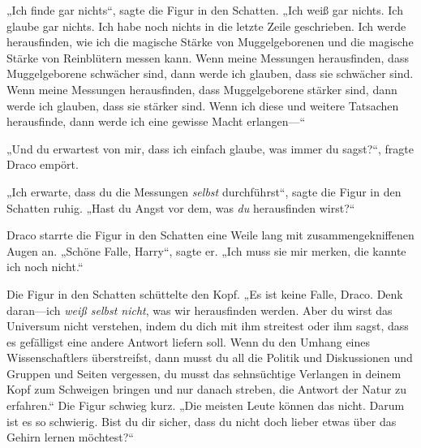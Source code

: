 „Ich finde gar nichts“, sagte die Figur in den Schatten. „Ich weiß gar nichts. Ich glaube gar nichts. Ich habe noch nichts in die letzte Zeile geschrieben. Ich werde herausfinden, wie ich die magische Stärke von Muggelgeborenen und die magische Stärke von Reinblütern messen kann. Wenn meine Messungen herausfinden, dass Muggelgeborene schwächer sind, dann werde ich glauben, dass sie schwächer sind. Wenn meine Messungen herausfinden, dass Muggelgeborene stärker sind, dann werde ich glauben, dass sie stärker sind. Wenn ich diese und weitere Tatsachen herausfinde, dann werde ich eine gewisse Macht erlangen—“

„Und du erwartest von mir, dass ich einfach glaube, was immer du sagst?“, fragte Draco empört.

„Ich erwarte, dass du die Messungen \emph{selbst} durchführst“, sagte die Figur in den Schatten ruhig. „Hast du Angst vor dem, was \emph{du} herausfinden wirst?“

Draco starrte die Figur in den Schatten eine Weile lang mit zusammengekniffenen Augen an. „Schöne Falle, Harry“, sagte er. „Ich muss sie mir merken, die kannte ich noch nicht.“

Die Figur in den Schatten schüttelte den Kopf. „Es ist keine Falle, Draco. Denk daran—ich \emph{weiß selbst nicht}, was wir herausfinden werden. Aber du wirst das Universum nicht verstehen, indem du dich mit ihm streitest oder ihm sagst, dass es gefälligst eine andere Antwort liefern soll. Wenn du den Umhang eines Wissenschaftlers überstreifst, dann musst du all die Politik und Diskussionen und Gruppen und Seiten vergessen, du musst das sehnsüchtige Verlangen in deinem Kopf zum Schweigen bringen und nur danach streben, die Antwort der Natur zu erfahren.“ Die Figur schwieg kurz. „Die meisten Leute können das nicht. Darum ist es so schwierig. Bist du dir sicher, dass du nicht doch lieber etwas über das Gehirn lernen möchtest?“


